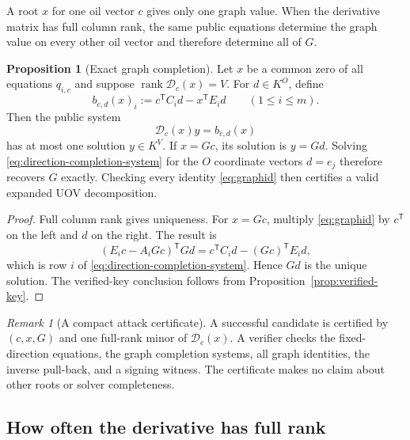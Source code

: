 \documentclass[11pt,a4paper]{article}
\theoremstyle{definition}
\newtheorem{proposition}[theorem]{Proposition}
\theoremstyle{remark}
\newtheorem{remark}[theorem]{Remark}
\newcommand{\rank}{\operatorname{rank}}
\begin{document}
A root $x$ for one oil vector $c$ gives only one graph value.  When the
derivative matrix has full column rank, the same public equations determine
the graph value on every other oil vector and therefore determine all of $G$.

\begin{proposition}[Exact graph completion]\label{prop:graph-direction-completion}
Let $x$ be a common zero of all equations $q_{i,c}$ and suppose
$\rank\mathcal D_c(x)=V$.  For $d\in K^O$, define
\begin{equation}\label{eq:direction-rhs}
 b_{c,d}(x)_i:=c^{\mathsf T}C_id-x^{\mathsf T}E_id
 \qquad(1\le i\le m).
\end{equation}
Then the public system
\begin{equation}\label{eq:direction-completion-system}
 \mathcal D_c(x)y=b_{c,d}(x)
\end{equation}
has at most one solution $y\in K^V$.  If $x=Gc$, its solution is $y=Gd$.
Solving \eqref{eq:direction-completion-system} for the $O$ coordinate vectors
$d=e_j$ therefore recovers $G$ exactly.  Checking every identity
\eqref{eq:graphid} then certifies a valid expanded UOV decomposition.
\end{proposition}

\begin{proof}
Full column rank gives uniqueness.  For $x=Gc$, multiply
\eqref{eq:graphid} by $c^{\mathsf T}$ on the left and $d$ on the right.  The
result is
\[
 (E_ic-A_iGc)^{\mathsf T}Gd
 =c^{\mathsf T}C_id-(Gc)^{\mathsf T}E_id,
\]
which is row $i$ of \eqref{eq:direction-completion-system}.  Hence $Gd$ is the
unique solution.  The verified-key conclusion follows from
Proposition~\ref{prop:verified-key}.
\end{proof}

\begin{remark}[A compact attack certificate]\label{rem:graph-certificate}
A successful candidate is certified by $(c,x,G)$ and one full-rank minor of
$\mathcal D_c(x)$.  A verifier checks the fixed-direction equations, the graph
completion systems, all graph identities, the inverse pull-back, and a signing
witness.  The certificate makes no claim about other roots or solver
completeness.
\end{remark}

\subsection{How often the derivative has full rank}
\end{document}
